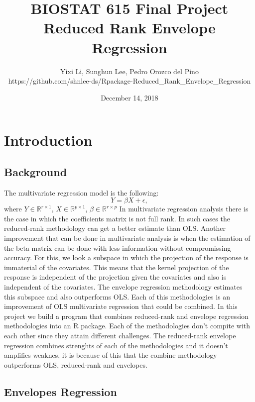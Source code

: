 \documentclass[11pt,a4paper]{article}
\title{\bf BIOSTAT 615 Final Project\\
Reduced Rank Envelope Regression }  %
\author{Yixi Li, Sunghun Lee, Pedro Orozco del Pino\\
https://github.com/shnlee-ds/Rpackage-Reduced\_Rank\_Envelope\_Regression}              %
\date{December 14, 2018}
\begin{document}
\maketitle                              
\section{Introduction}
\subsection{Background}
The multivariate regression model is the following:
$$Y=\beta X+\epsilon,$$
where $Y\in \mathbb{R}^{r\times 1}$, $X\in\mathbb{R}^{p\times 1}$, $\beta\in\mathbb{R}^{r\times p}$
In multivariate regression analysis there is the case in which the coefficients matrix is not full rank. In such cases the reduced-rank methodology can get a better estimate than OLS. Another improvement that can be done in multivariate analysis is when the estimation of the beta matrix can be done with less information without compromissing accuracy. For this, we look a subspace in which the projection of the response is immaterial of the covariates. This means that the kernel projection of the response is independent of the projection given the covariates and also is independent of the covariates. The envelope regression methodology estimates this subspace and also outperforms OLS. Each of this methodologies is an improvement of OLS multivariate regression that could be combined. In this project we build a program that combines reduced-rank and envelope regression methodologies into an R package. Each of the methodologies don't compite with each other since they attain different challenges. The reduced-rank envelope regression combines strenghts of each of the methodologies and it doesn't amplifies weaknes, it is because of this that the combine methodology outperforms OLS, reduced-rank and envelopes. 



\subsection{Envelopes Regression}
\end{document}
